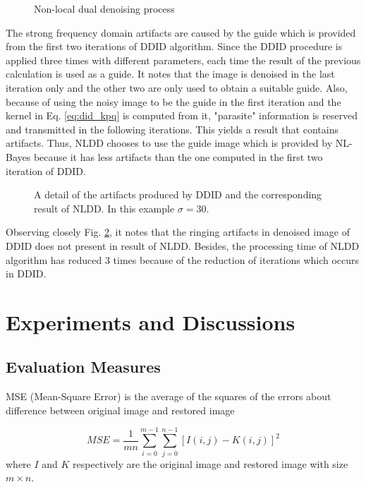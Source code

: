 \begin{figure}[ht]
	\caption{Non-local dual denoising process}
	\label{fig:nldd_process}
\end{figure}

The strong frequency domain artifacts are caused by the guide which is provided from the first two iterations of DDID algorithm. Since the DDID procedure is applied three times with different parameters, each time the result of the previous calculation is used as a guide. It notes that the image is denoised in the last iteration only and the other two are only used to obtain a suitable guide. Also, because of using the noisy image to be the guide in the first iteration and the kernel in Eq. \ref{eq:did_kpq} is computed from it, "parasite" information is reserved and transmitted in the following iterations. This yields a result that contains artifacts. Thus, NLDD chooses to use the guide image which is provided by NL-Bayes \cite{Lebrun2012} because it has less artifacts than the one computed in the first two iteration of DDID.

\begin{figure}[ht]
	\caption{A detail of the artifacts produced by DDID and the corresponding result of NLDD. In this example $\sigma = 30$. \cite{Pierazzo2014} }
	\label{fig:nldd_result}
\end{figure}

Observing closely Fig. \ref{fig:nldd_result}, it notes that the ringing artifacts in denoised image of DDID does not present in result of NLDD. Besides, the processing time of NLDD algorithm has reduced 3 times because of the reduction of iterations which occurs in DDID.

\section{Experiments and Discussions}
\subsection{Evaluation Measures}
MSE (Mean-Square Error) is  the average of the squares of the errors about difference between original image and restored image

\begin{equation}
    \label{eq:mse}
    MSE = \frac{1}{mn}\sum_{i=0}^{m-1}\sum_{j=0}^{n-1}\left[I\left(i, j\right) - K\left(i, j\right)\right]^{2}
\end{equation}
where $I$ and $K$ respectively are the original image and restored image with size $m \times n$.

